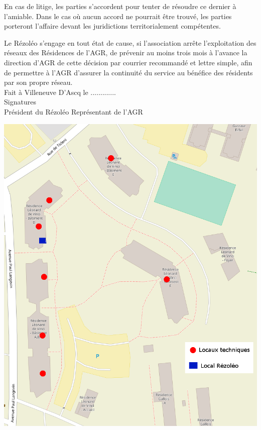 \documentclass[12pt]{constitution}
\begin{document}
    En cas de litige, les parties s'accordent pour tenter de résoudre ce dernier à l'amiable. Dans le cas où aucun accord ne pourrait être trouvé, les parties porteront l'affaire devant les juridictions territorialement compétentes.


    Le Rézoléo s'engage en tout état de cause, si l'association arrête l'exploitation des réseaux des Résidences de l'AGR, de prévenir au moins trois mois à l'avance la direction d'AGR de cette décision par courrier recommandé et lettre simple, afin de permettre à l'AGR d'assurer la continuité du service au bénéfice des résidents par son propre réseau.\\

Fait à Villeneuve D'Ascq le .............\\


\noindent Signatures \\
Président du Rézoléo \hfill Représentant de l'AGR

    \newpage

    \includegraphics[scale=0.6]{carteLocaux.png}
\end{document}
